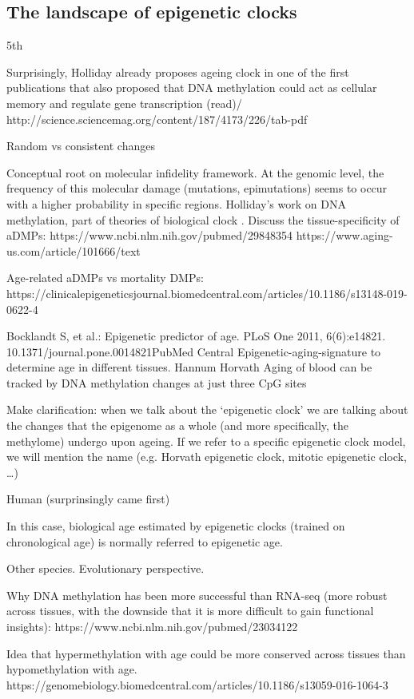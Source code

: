 \subsection{The landscape of epigenetic clocks}

5th

Surprisingly, Holliday already proposes ageing clock in one of the first publications that also proposed that DNA methylation could act as cellular memory and regulate gene transcription (read)/ http://science.sciencemag.org/content/187/4173/226/tab-pdf

Random vs consistent changes

Conceptual root on molecular infidelity framework. At the genomic level, the frequency of this molecular damage (mutations, epimutations) seems to occur with a higher probability in specific regions. 
Holliday's work on DNA methylation, part of theories of biological clock \cite{Medvedev1990}. 
Discuss the tissue-specificity of aDMPs:
https://www.ncbi.nlm.nih.gov/pubmed/29848354
https://www.aging-us.com/article/101666/text

Age-related aDMPs vs mortality DMPs:
https://clinicalepigeneticsjournal.biomedcentral.com/articles/10.1186/s13148-019-0622-4

Bocklandt S, et al.: Epigenetic predictor of age. PLoS One 2011, 6(6):e14821. 10.1371/journal.pone.0014821PubMed Central
Epigenetic-aging-signature to determine age in different tissues.
Hannum
Horvath
Aging of blood can be tracked by DNA methylation changes at just three CpG sites


Make clarification: when we talk about the ‘epigenetic clock’ we are talking about the changes that the epigenome as a whole (and more specifically, the methylome) undergo upon ageing. If we refer to a specific epigenetic clock model, we will mention the name (e.g. Horvath epigenetic clock, mitotic epigenetic clock, …)

Human (surprinsingly came first)

In this case, biological age estimated by epigenetic clocks (trained on chronological age) is normally referred to epigenetic age. 

Other species. Evolutionary perspective.

Why DNA methylation has been more successful than RNA-seq (more robust across tissues, with the downside that it is more difficult to gain functional insights): https://www.ncbi.nlm.nih.gov/pubmed/23034122

Idea that hypermethylation with age could be more conserved across tissues than hypomethylation with age.
https://genomebiology.biomedcentral.com/articles/10.1186/s13059-016-1064-3

